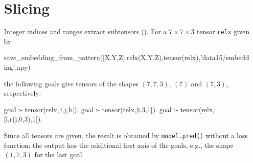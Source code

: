 \documentclass[a4paper]{report}
\begin{document}
\section{Slicing}
\label{sec:tutorial_slice}

Integer indices and ranges extract subtensors ().
For a $7\times 7\times 3$ tensor {\tt relx} given by
\begin{prologcode}
save_embedding_from_pattern([X,Y,Z],relx(X,Y,Z),tensor(relx),'data15/embedding',npy)
\end{prologcode}
the following goals give tensors of the shapes $(7,7,3)$, $(7)$ and $(7,3)$, respectively:
\begin{prologcode}
goal :- tensor(relx,[i,j,k]).
goal :- tensor(relx,[i,3,1]).
goal :- tensor(relx,[i,r(j,0,3),1]).
\end{prologcode}
Since all tensors are given, the result is obtained by {\tt model.pred()}
without a loss function; the output has the additional first axis of the
goals, e.g., the shape $(1,7,3)$ for the last goal.


\end{document}
